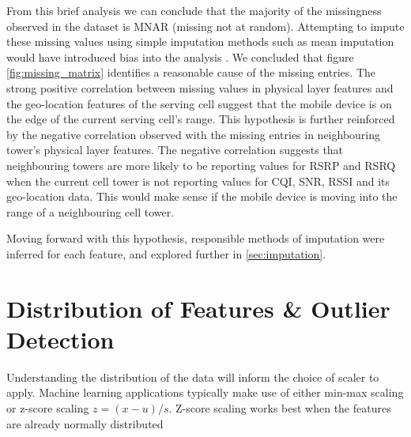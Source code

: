 From this brief analysis we can conclude that the majority of the missingness observed in the dataset is MNAR (missing not at random). Attempting to impute these missing values using simple imputation methods such as mean imputation would have introduced bias into the analysis \cite{DONDERS20061087}. We concluded that figure \ref{fig:missing_matrix} identifies a reasonable cause of the missing entries. The strong positive correlation between missing values in physical layer features and the geo-location features of the serving cell suggest that the mobile device is on the edge of the current serving cell's range. This hypothesis is further reinforced by the negative correlation observed with the missing entries in neighbouring tower's physical layer features. The negative correlation suggests that neighbouring towers are more likely to be reporting values for RSRP and RSRQ when the current cell tower is not reporting values for CQI, SNR, RSSI and its geo-location data. This would make sense if the mobile device is moving into the range of a neighbouring cell tower.

Moving forward with this hypothesis, responsible methods of imputation were inferred for each feature, and explored further in \ref{sec:imputation}.

\section{Distribution of Features \& Outlier Detection}



Understanding the distribution of the data will inform the choice of scaler to apply. Machine learning applications typically make use of either min-max scaling or z-score scaling $z = (x - u) / s$. Z-score scaling works best when the features are already normally distributed